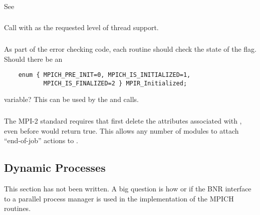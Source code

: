 \documentclass{article}
\begin{document}
\subsubsection{}
See 

\subsubsection{}
Call  with  as the
requested level of thread support.

\subsubsection{}
As part of the error checking code, each routine should check the
state of the  flag.  Should there be an 
\begin{verbatim}
    enum { MPICH_PRE_INIT=0, MPICH_IS_INITIALIZED=1,
           MPICH_IS_FINALIZED=2 } MPIR_Initialized;
\end{verbatim}
variable?  This can be used by the  and
 calls.

\subsubsection{}
The MPI-2 standard requires that  first delete the
attributes associated with , even before
 would return true.  This allows any number of
modules to attach ``end-of-job'' actions to .


\subsection{Dynamic Processes}

This section has not been written.  A big question is how or if the BNR
interface to a parallel process manager is used in the implementation
of the MPICH routines.  

\subsubsection{}

\subsubsection{}
\end{document}
